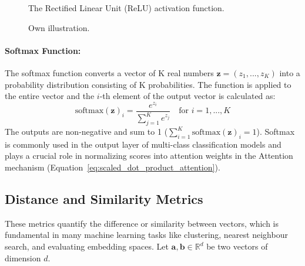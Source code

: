 \begin{appendices}
  \begin{figure}[htbp]
    \centering
    \caption[ReLU activation function]{The Rectified Linear Unit (ReLU) activation function.}
    \label{fig:relu_plot}
    \caption*{Own illustration.}
  \end{figure}


  \paragraph{Softmax Function:}
  The softmax function converts a vector of K real numbers \( \bm{z} = (z_1, ..., z_K) \) into a probability distribution consisting of K probabilities. The function is applied to the entire vector and the \( i \)-th element of the output vector is calculated as:
  \begin{equation}
    \text{softmax}(\bm{z})_i = \frac{e^{z_i}}{\sum_{j=1}^K e^{z_j}} \quad \text{for } i = 1, ..., K
  \end{equation}
  The outputs are non-negative and sum to 1 (\( \sum_{i=1}^K \text{softmax}(\bm{z})_i = 1 \)). Softmax is commonly used in the output layer of multi-class classification models and plays a crucial role in normalizing scores into attention weights in the Attention mechanism (Equation~\ref{eq:scaled_dot_product_attention}).

  \subsection{Distance and Similarity Metrics}
  \label{subsec:distance_metrics}
  These metrics quantify the difference or similarity between vectors, which is fundamental in many machine learning tasks like clustering, nearest neighbour search, and evaluating embedding spaces. Let \( \bm{a}, \bm{b} \in \mathbb{R}^d \) be two vectors of dimension \( d \).


\end{appendices}
